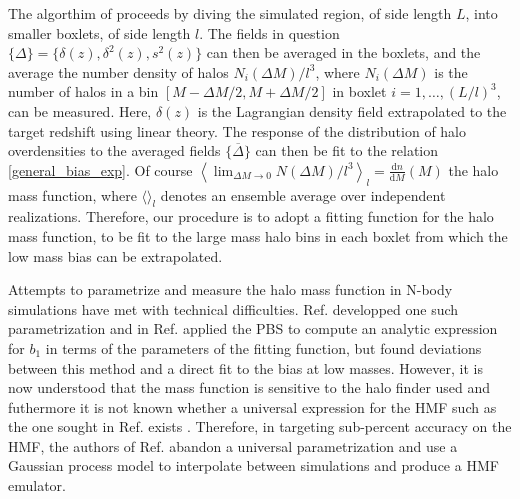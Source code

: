 The algorthim of \citeauthor{modietal2017} proceeds by diving the simulated region, of side length $L$, into smaller boxlets, of side length $l$. The fields in question $\{\Delta\} = \{\delta(z), \delta^2(z), s^2(z)\}$ can then be averaged in the boxlets, and the average the number density of halos $N_i(\Delta M)/l^3$, where $N_i(\Delta M)$ is the number of halos in a bin $[M - \Delta M/2, M + \Delta M/2]$ in boxlet $i = 1, \dots, (L/l)^3$, can be measured. Here, $\delta(z)$ is the Lagrangian density field extrapolated to the target redshift using linear theory. The response of the distribution of halo overdensities to the averaged fields $\{\overline{\Delta}\}$ can then be fit to the relation \ref{general_bias_exp}. Of course $\left\langle \lim_{\Delta M \rightarrow 0} N(\Delta M)/l^3 \right\rangle_l = \frac{\mathrm{d}n}{\mathrm{d}M}(M)$ the halo mass function, where $\langle \rangle_l$ denotes an ensemble average over independent realizations. Therefore, our procedure is to adopt a fitting function for the halo mass function, to be fit to the large mass halo bins in each boxlet from which the low mass bias can be extrapolated.

Attempts to parametrize and measure the halo mass function in N-body simulations have met with technical difficulties. Ref. \citep{tinker2008} developped one such parametrization and in Ref. \citep{tinker2010} applied the PBS to compute an analytic expression for $b_1$ in terms of the parameters of the fitting function, but found deviations between this method and a direct fit to the bias at low masses. However, it is now understood that the mass function is sensitive to the halo finder used and futhermore it is not known whether a universal expression for the HMF such as the one sought in Ref. \citep{tinker2008} exists \citep{desjacquesetal2018}. Therefore, in targeting sub-percent accuracy on the HMF, the authors of Ref. \citep{aemulushmf} abandon a universal parametrization and use a Gaussian process model to interpolate between simulations and produce a HMF emulator.

